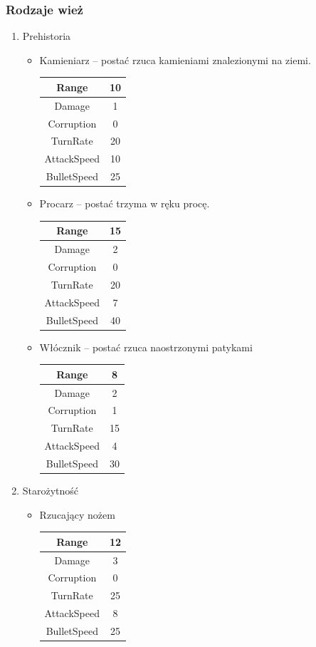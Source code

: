 \documentclass[a4paper,12pt, twoside, titlepage]{article}
\begin{document}
\subsubsection{Rodzaje wież}
\begin{enumerate}
	\item Prehistoria
	\begin{itemize}
		\item Kamieniarz -- postać rzuca kamieniami znalezionymi na ziemi.
		\begin{longtable}[l]{|c|c|} 
		\hline
		Range & 10 \\
		\hline
		Damage & 1 \\ 
		\hline 
		Corruption & 0 \\ 
		\hline
		TurnRate & 20 \\ 
		\hline
		AttackSpeed & 10 \\ 
		\hline
		BulletSpeed & 25 \\ 
		\hline
		\end{longtable}

		\item Procarz -- postać trzyma w ręku procę.
		\begin{longtable}[l]{|c|c|} 
		\hline
		Range & 15 \\
		\hline
		Damage & 2 \\ 
		\hline 
		Corruption & 0 \\ 
		\hline
		TurnRate & 20 \\ 
		\hline
		AttackSpeed & 7 \\ 
		\hline
		BulletSpeed & 40 \\ 
		\hline
		\end{longtable}		
		
		\item Włócznik -- postać rzuca naostrzonymi patykami
		\begin{longtable}[l]{|c|c|} 
		\hline
		Range & 8 \\
		\hline
		Damage & 2 \\ 
		\hline 
		Corruption & 1 \\ 
		\hline
		TurnRate & 15 \\ 
		\hline
		AttackSpeed & 4 \\ 
		\hline
		BulletSpeed & 30 \\ 
		\hline
		\end{longtable}	
	\end{itemize}
	\newpage
	\item Starożytność
	\begin{itemize}
		\item Rzucający nożem
		\begin{longtable}[l]{|c|c|} 
		\hline
		Range & 12 \\
		\hline
		Damage & 3 \\ 
		\hline 
		Corruption & 0 \\ 
		\hline
		TurnRate & 25 \\ 
		\hline
		AttackSpeed & 8 \\ 
		\hline
		BulletSpeed & 25 \\ 
		\hline
		\end{longtable}	
		

\end{itemize}
\end{enumerate}
\end{document}
